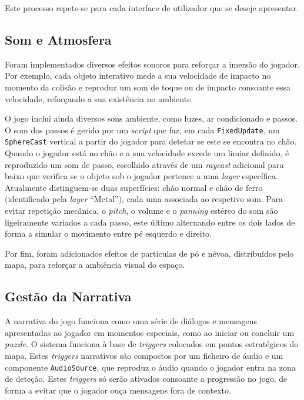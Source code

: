 \documentclass[a4paper, 12pt]{book}
\begin{document}
Este processo repete-se para cada interface de utilizador que se deseje apresentar.

\subsection{Som e Atmosfera}
\label{ssec:som}

Foram implementados diversos efeitos sonoros para reforçar a imersão
do jogador. Por exemplo, cada objeto interativo mede a sua velocidade de impacto no
momento da colisão e reproduz um som de toque ou de impacto consoante
essa velocidade, reforçando a sua existência no ambiente.
\par
O jogo inclui ainda diversos sons ambiente, como luzes, ar condicionado
e passos. O som dos passos é gerido por um \textit{script} que faz, em cada
\texttt{FixedUpdate}, um \texttt{SphereCast} vertical a partir do
jogador para detetar se este se encontra no chão. Quando o jogador está
no chão e a sua velocidade excede um limiar definido, é reproduzido um
som de passo, escolhido através de um \textit{raycast} adicional para
baixo que verifica se o objeto sob o jogador pertence a uma
\textit{layer} específica. Atualmente distinguem-se duas superfícies:
chão normal e chão de ferro (identificado pela \textit{layer}
``Metal''), cada uma associada ao respetivo som. Para evitar repetição
mecânica, o \textit{pitch}, o volume e o \textit{panning} estéreo do
som são ligeiramente variados a cada passo, este último alternando
entre os dois lados de forma a simular o movimento entre pé esquerdo e
direito.
\par
Por fim, foram adicionados efeitos de partículas de pó e névoa,
distribuídos pelo mapa, para reforçar a ambiência visual do
espaço.


\subsection{Gestão da Narrativa}
\label{ssec:gestao-narrativa}
A narrativa do jogo funciona como uma série de diálogos e mensagens apresentadas ao jogador
em momentos especiais, como ao iniciar ou concluir um \textit{puzzle}. O sistema funciona à base
de \textit{triggers} colocados em pontos estratégicos do mapa. Estes \textit{triggers} narrativos são compostos
por um ficheiro de áudio e um componente \texttt{AudioSource}, que reproduz o áudio quando o jogador entra 
na zona de deteção. Estes \textit{triggers} só serão ativados consoante a progressão no jogo, de forma 
a evitar que o jogador ouça mensagens fora de contexto.
\end{document}
